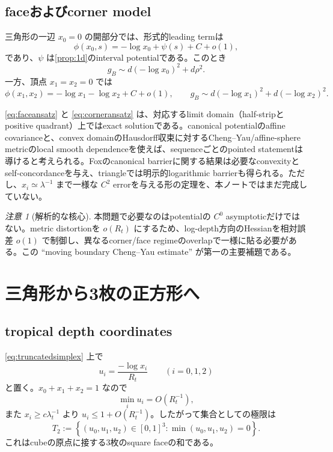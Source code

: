 \documentclass[11pt,a4paper]{ltjsarticle}
\theoremstyle{definition}
\theoremstyle{remark}
\newtheorem{remark}[theorem]{注意}
\begin{document}
\subsection{faceおよびcorner model}

三角形の一辺 $x_0=0$ の開部分では、形式的leading termは
\begin{equation}\label{eq:faceansatz}
 \phi(x_0,s)=-\log x_0+\psi(s)+C+o(1),
\end{equation}
であり、$\psi$ は\cref{prop:1d}のinterval potentialである。このとき
\begin{equation}\label{eq:facemetric}
 g_B\sim d(-\log x_0)^2+d\rho^2.
\end{equation}
一方、頂点 $x_1=x_2=0$ では
\begin{equation}\label{eq:corneransatz}
 \phi(x_1,x_2)=-\log x_1-\log x_2+C+o(1),
 \qquad
 g_B\sim d(-\log x_1)^2+d(-\log x_2)^2.
\end{equation}

\eqref{eq:faceansatz} と \eqref{eq:corneransatz} は、対応するlimit domain（half-stripとpositive quadrant）上ではexact solutionである。canonical potentialのaffine covarianceと、convex domainのHausdorff収束に対するCheng--Yau/affine-sphere metricのlocal smooth dependenceを使えば、sequenceごとのpointed statementは導けると考えられる。Foxのcanonical barrierに関する結果は必要なconvexityとself-concordanceを与え、triangleでは明示的logarithmic barrierも得られる\cite{Fox}。ただし、$x_i\simeq\lambda^{-1}$ まで一様な $C^2$ errorを与える形の定理を、本ノートではまだ完成していない。

\begin{remark}[解析的な核心]
本問題で必要なのはpotentialの $C^0$ asymptoticだけではない。metric distortionを $o(R_t)$ にするため、log-depth方向のHessianを相対誤差 $o(1)$ で制御し、異なるcorner/face regimeのoverlapで一様に貼る必要がある。この ``moving boundary Cheng--Yau estimate'' が第一の主要補題である。
\end{remark}

\section{三角形から3枚の正方形へ}

\subsection{tropical depth coordinates}

\eqref{eq:truncatedsimplex} 上で
\begin{equation}\label{eq:depthcoordinates}
 u_i=\frac{-\log x_i}{R_t}\qquad(i=0,1,2)
\end{equation}
と置く。$x_0+x_1+x_2=1$ なので
\[
 \min_i u_i=O(R_t^{-1}),
\]
また $x_i\geq c\lambda_t^{-1}$ より $u_i\leq1+O(R_t^{-1})$。したがって集合としての極限は
\begin{equation}\label{eq:tropicaltriangle}
 T_2:=\left\{(u_0,u_1,u_2)\in[0,1]^3:\min(u_0,u_1,u_2)=0\right\}.
\end{equation}
これはcubeの原点に接する3枚のsquare faceの和である。
\end{document}
